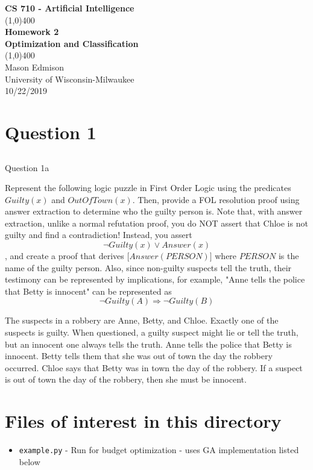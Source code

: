 \documentclass[11pt]{article}
\begin{document}
\begin{titlepage}
\begin{center}
\Large{\textbf{CS 710 - Artificial Intelligence}} \\
\vfill
\line(1,0){400} \\
\huge{\textbf{Homework 2}} \\
\Large{\textbf{Optimization and Classification}} \\
\line(1,0){400}\\
\vfill
Mason Edmison\\
University of Wisconsin-Milwaukee\\
10/22/2019
\end{center}
\end{titlepage}

\section{Question 1}
\subsection{}
Question 1a

Represent the following logic puzzle in First Order Logic using the predicates $Guilty(x)$ and $OutOfTown(x)$.  Then, provide a FOL resolution proof using answer extraction to determine who the guilty person is. Note that, with answer extraction,  unlike a normal refutation proof, you do NOT assert that Chloe is not guilty and find a contradiction! Instead, you assert $$\lnot Guilty(x) \lor Answer(x)$$, and create a proof that derives [$Answer(PERSON)]$ where $PERSON$ is the name of the guilty person.  Also, since non-guilty suspects tell the truth, their testimony can be represented by implications, for example, "Anne tells the police that Betty is innocent" can be represented as $$\lnot Guilty(A) \Rightarrow  \lnot Guilty(B)$$

The suspects in a robbery are Anne, Betty, and Chloe.
Exactly one of the suspects is guilty.
When questioned, a guilty suspect might lie or tell the truth, but an innocent one always tells the truth.
Anne tells the police that Betty is innocent.
Betty tells them that she was out of town the day the robbery occurred.
Chloe says that Betty was in town the day of the robbery.
If a suspect is out of town the day of the robbery, then she must be innocent.

\subsection{}


\section{Files of interest in this directory}
\begin{itemize}
\item \texttt{example.py} - Run for budget optimization - uses GA implementation listed below

\end{itemize}
\end{document}
